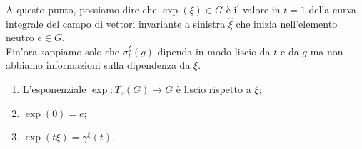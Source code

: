 A questo punto, possiamo dire che $ \exp(\xi) \in G $ è il valore in $ t=1 $ della curva integrale del campo di vettori invariante a sinistra $ \hat{\xi} $ che inizia nell'elemento neutro $ e \in G $.\\
Fin'ora sappiamo solo che $ \sigma_{t}^{\xi}(g) $ dipenda in modo liscio da $ t $ e da $ g $ ma non abbiamo informazioni sulla dipendenza da $ \xi $.

\begin{definition}\hfill\break
	\begin{enumerate}
		\item L'esponenziale $ \exp : T_{e}(G) \to G $ è liscio rispetto a $ \xi $;
		
		\item $ \exp(0) = e $;
		
		\item $ \exp(t \xi) = \gamma^{\xi}(t) $.
	\end{enumerate}
\end{definition}

